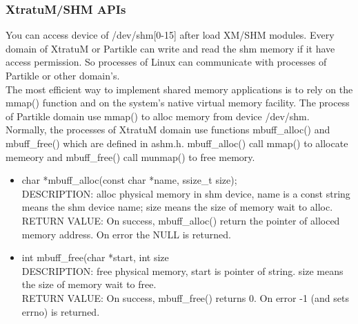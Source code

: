 \subsubsection{XtratuM/SHM APIs}
You can access device of /dev/shm[0-15] after load XM/SHM modules. Every domain of XtratuM or Partikle can write and read the shm memory if it have access permission. So processes of Linux can communicate with processes of Partikle or other domain's.
\\
The most efficient way to implement shared memory applications is to rely on the mmap() function and on the system's native virtual memory facility. The process of Partikle domain use mmap() to alloc memory from device /dev/shm. Normally, the processes of XtratuM domain use functions mbuff\_alloc() and mbuff\_free() which are defined in ashm.h. mbuff\_alloc() call mmap() to allocate memeory and mbuff\_free() call munmap() to free memory.
\begin{itemize}
\item char *mbuff\_alloc(const char *name, ssize\_t size); 
\\
DESCRIPTION: alloc physical memory in shm device, name is a const string means the shm device name; size means the size of memory wait to alloc.
\\
RETURN VALUE: On success, mbuff\_alloc() return the pointer of alloced memory address. On error the NULL is returned.
\\
\item int mbuff\_free(char *start, int size\\
DESCRIPTION: free physical memory, start is pointer of string. size means the size of memory wait to free.
\\
RETURN VALUE: On success, mbuff\_free() returns 0. On error -1 (and sets errno) is returned.
\end{itemize}

